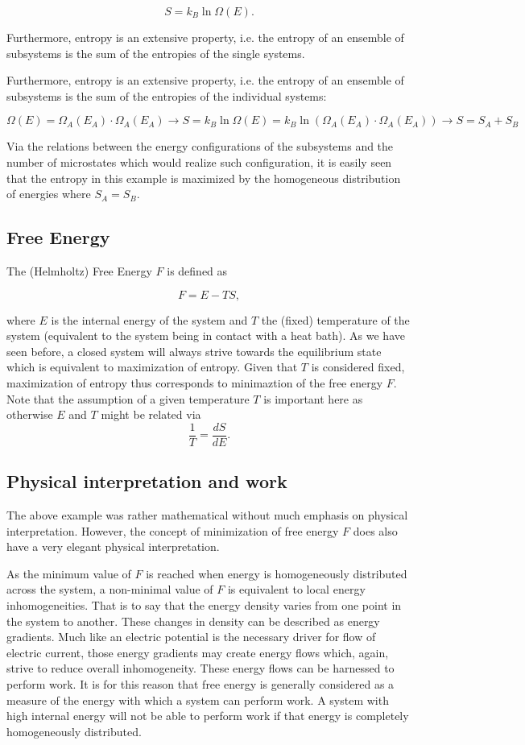 $$S = k_B \ln \Omega(E).$$

Furthermore, entropy is an extensive property, i.e. the entropy of an ensemble of subsystems is the sum of the entropies of the single systems. 


Furthermore, entropy is an extensive property, i.e. the entropy of an ensemble of subsystems is the sum of the entropies of the individual systems:

$$\Omega(E) = \Omega_A(E_A)\cdot \Omega_A(E_A) \rightarrow S = k_B \ln \Omega(E) = k_B \ln \left( \Omega_A(E_A)\cdot \Omega_A(E_A) \right) \rightarrow S = S_A + S_B$$

Via the relations between the energy configurations of the subsystems and the number of microstates which would realize such configuration, it is easily seen that the entropy in this example is maximized by the homogeneous distribution of energies where $S_A = S_B$.

\subsection{Free Energy}

The (Helmholtz) Free Energy $F$ is defined as

$$F = E -TS,$$

where $E$ is the internal energy of the system and $T$ the (fixed) temperature of the system (equivalent to the system being in contact with a heat bath). As we have seen before, a closed system will always strive towards the equilibrium state which is equivalent to maximization of entropy. Given that $T$ is considered fixed, maximization of entropy thus corresponds to minimaztion of the free energy $F$. Note that the assumption of a given temperature $T$ is important here as otherwise $E$ and $T$ might be related via $$ \frac{1}{T} = \frac{dS}{dE}.$$


\subsection{Physical interpretation and work}

The above example was rather mathematical without much emphasis on physical interpretation. However, the concept of minimization of free energy $F$ does also have a very elegant physical interpretation.

As the minimum value of $F$ is reached when energy is homogeneously distributed across the system, a non-minimal value of $F$ is equivalent to local energy inhomogeneities. That is to say that the energy density varies from one point in the system to another. These changes in density can be described as energy gradients. Much like an electric potential is the necessary driver for flow of electric current, those energy gradients may create energy flows which, again, strive to reduce overall inhomogeneity. These energy flows can be harnessed to perform work. It is for this reason that free energy is generally considered as a measure of the energy with which a system can perform work. A system with high internal energy will not be able to perform work if that energy is completely homogeneously distributed.


